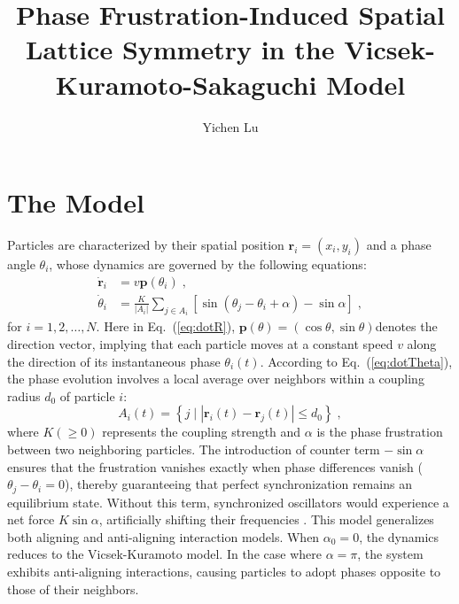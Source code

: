 \documentclass{article}
\title{\textbf{Phase Frustration-Induced Spatial Lattice Symmetry in the Vicsek-Kuramoto-Sakaguchi Model}}
\author{Yichen Lu}
\begin{document}
\maketitle

\tableofcontents

\section{The Model}

Particles are characterized by their spatial position $\mathbf{r}_i=\left( x_i, y_i \right)$ and a phase angle $\theta_i$, whose dynamics are governed by the following equations:
\begin{subequations} 
    \label{eq:totalDynamicsMeanField}
    \begin{align}
        \dot{\mathbf{r}}_i&=v\mathbf{p}\left( \theta _i \right)\;\label{eq:dotR},
        \\
        \dot{\theta}_i&=\frac{K}{\left| A_i \right|}\sum_{j\in A_i}{\left[ \sin \left( \theta _j-\theta _i+\alpha \right) -\sin \alpha \right]}\;\label{eq:dotTheta},
    \end{align}
\end{subequations}
for $i=1,2,\ldots,N$. Here in Eq.~(\ref{eq:dotR}), $\mathbf{p}\left( \theta \right) =( \cos \theta ,\sin \theta )$denotes the direction vector, implying that each particle moves at a constant speed $v$ along the direction of its instantaneous phase $\theta_i (t)$. 
According to Eq.~(\ref{eq:dotTheta}), the phase evolution involves a local average over neighbors within a coupling radius $d_0$ of particle $i$:
\begin{equation}
    A_i\left( t \right) =\left\{ j\mid \left| \mathbf{r}_i\left( t \right) -\mathbf{r}_j\left( t \right) \right|\leqslant d_0 \right\} \;,
\end{equation}
where $K \left(\geqslant 0\right)$ represents the coupling strength and $\alpha$ is the phase frustration between two neighboring particles. 
The introduction of counter term $-\sin\alpha$ ensures that the frustration vanishes exactly when phase differences vanish ($\theta_j - \theta_i = 0$), thereby guaranteeing that perfect synchronization remains an equilibrium state. Without this term, synchronized oscillators would experience a net force $K\sin\alpha$, artificially shifting their frequencies \cite{10.1143/PTP.79.1069}.
This model generalizes both aligning \cite{PhysRevLett.119.058002,PhysRevResearch.1.023026,Escaff2020,PhysRevLett.127.238001,PhysRevLett.133.258302} and anti-aligning \cite{PhysRevE.109.024602,PhysRevE.110.024603} interaction models. When $\alpha_0=0$, the dynamics reduces to the Vicsek-Kuramoto model.
In the case where $\alpha=\pi$, the system exhibits anti-aligning interactions, causing particles to adopt phases opposite to those of their neighbors.
\end{document}
